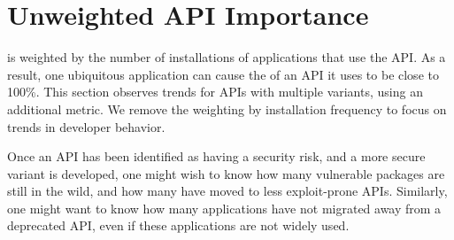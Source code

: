 \section{Unweighted API Importance}
\label{sec:syspop:security}

\Usagemetric{} is weighted by the number of installations
of applications that use the API.
As a result, one ubiquitous application can cause the \usagemetric{} of an API it uses to be close to 100\%.
This section observes trends for APIs with multiple variants, using an additional 
\unwusagemetric{} metric. 
We remove the weighting by installation frequency to focus on 
trends in developer behavior.



Once an API has been identified as having a security risk, and a more secure variant
is developed, one might wish to know how many 
vulnerable packages are still in the wild,
and how many have moved to less exploit-prone APIs.
Similarly, one might want to know how many applications have not migrated away from a deprecated API,
even if these applications are not widely used.



